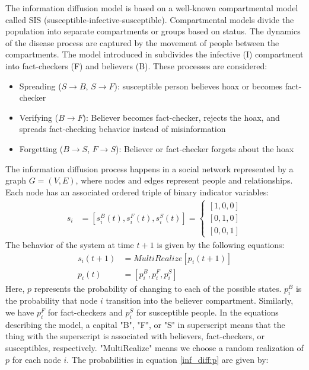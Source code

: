 \documentclass[conference]{IEEEtran}
\begin{document}
The information diffusion model is based on a well-known compartmental model called SIS (susceptible-infective-susceptible). Compartmental models divide the population into separate compartments or groups based on status. The dynamics of the disease process are captured by the movement of people between the compartments.\cite{Hethcote2000TheMO} The model introduced in \cite{Tambuscio15} subdivides the infective (I) compartment into fact-checkers (F) and believers (B). These processes are considered:
\begin{itemize}
    \item Spreading ($S \rightarrow B$, $S \rightarrow F$): susceptible person believes hoax or becomes fact-checker
    \item Verifying ($B \rightarrow F$): Believer becomes fact-checker, rejects the hoax, and spreads fact-checking behavior instead of misinformation
    \item Forgetting ($B \rightarrow S$, $F \rightarrow S$): Believer or fact-checker forgets about the hoax
\end{itemize}
The information diffusion process happens in a social network represented by a graph $G = (V,E)$, where nodes and edges represent people and relationships. Each node has an associated ordered triple of binary indicator variables:
\begin{align}
    s_{i} &= \left[ s^{B}_{i}(t),s^{F}_{i}(t),s^{S}_{i}(t) \right] = \left\{ \begin{matrix}
    \left[1,0,0\right]\\
    \left[0,1,0\right]\\
    \left[0,0,1\right]
    \end{matrix}
    \right.
\end{align}
The behavior of the system at time $t+1$ is given by the following equations:
\begin{align}
    s_{i}(t+1) &= MultiRealize\left[p_{i}(t+1)\right]\\
    p_{i}(t) &= \left[p^{B}_{i},p^{F}_{i},p^{S}_{i} \right]\label{inf_diff:p}
\end{align}
Here, $p$ represents the probability of changing to each of the possible states. $p^{B}_{i}$ is the probability that node $i$ transition into the believer compartment. Similarly, we have $p^{F}_{i}$ for fact-checkers and $p^{S}_{i}$ for susceptible people. In the equations describing the model, a capital "B", "F", or "S" in superscript means that the thing with the superscript is associated with believers, fact-checkers, or susceptibles, respectively. "MultiRealize" means we choose a random realization of $p$ for each node $i$. The probabilities in equation \ref{inf_diff:p} are given by:
\end{document}
